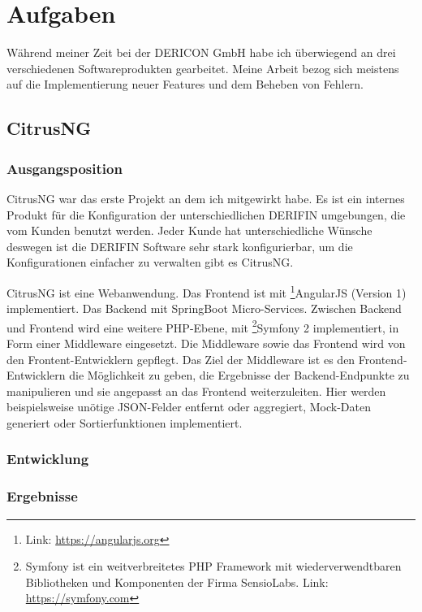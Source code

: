 \documentclass[chapterprefix=false, 12pt, a4paper, oneside, parskip=half, listof=totoc, bibliography=totoc, numbers=noendperiod]{scrbook}
\begin{document}
    \chapter{Aufgaben}

    Während meiner Zeit bei der DERICON GmbH habe ich überwiegend an drei verschiedenen Softwareprodukten gearbeitet.
    Meine Arbeit bezog sich meistens auf die Implementierung neuer Features und dem Beheben von Fehlern.

    \section{CitrusNG}

    \subsection{Ausgangsposition}

    CitrusNG war das erste Projekt an dem ich mitgewirkt habe. Es ist ein internes Produkt für die Konfiguration der unterschiedlichen DERIFIN umgebungen, die
    vom Kunden benutzt werden. Jeder Kunde hat unterschiedliche Wünsche deswegen ist die DERIFIN Software sehr stark konfigurierbar, um die Konfigurationen einfacher
    zu verwalten gibt es CitrusNG.

    CitrusNG ist eine Webanwendung. Das Frontend ist mit \footnote{Link: \url{https://angularjs.org}}AngularJS (Version 1) implementiert. Das Backend mit SpringBoot Micro-Services.
    Zwischen Backend und Frontend wird eine weitere PHP-Ebene, mit \footnote{Symfony ist ein weitverbreitetes PHP Framework mit wiederverwendtbaren Bibliotheken und Komponenten der Firma SensioLabs. Link: \url{https://symfony.com}}Symfony 2 implementiert, in Form einer Middleware eingesetzt.
    Die Middleware sowie das Frontend wird von den Frontent-Entwicklern gepflegt.
     Das Ziel der Middleware ist es den Frontend-Entwicklern die Möglichkeit zu geben, die Ergebnisse der
    Backend-Endpunkte zu manipulieren und sie angepasst an das Frontend weiterzuleiten. Hier werden beispielsweise unötige JSON-Felder entfernt oder
    aggregiert, Mock-Daten generiert oder Sortierfunktionen implementiert.

    \subsection{Entwicklung}

    \subsection{Ergebnisse}
\end{document}
